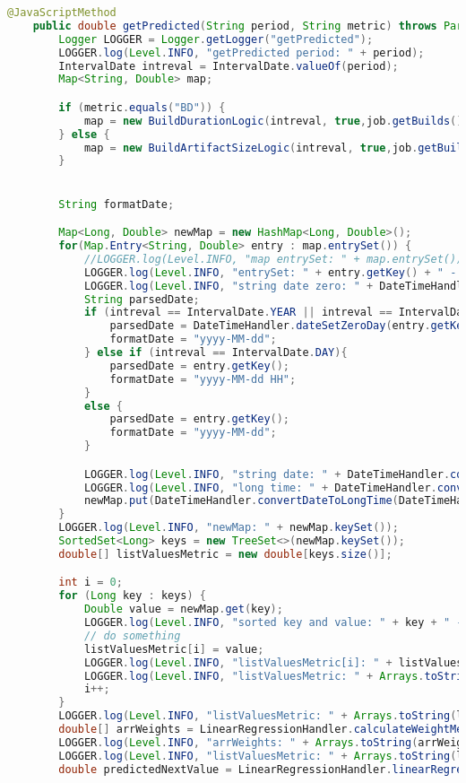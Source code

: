 \begin{lstlisting}[language=Java]
    @JavaScriptMethod
    public double getPredicted(String period, String metric) throws ParseException {
        Logger LOGGER = Logger.getLogger("getPredicted");
        LOGGER.log(Level.INFO, "getPredicted period: " + period);
        IntervalDate intreval = IntervalDate.valueOf(period);
        Map<String, Double> map;

        if (metric.equals("BD")) {
            map = new BuildDurationLogic(intreval, true,job.getBuilds()).getBuildsDuration(Statistics.AVG);
        } else {
            map = new BuildArtifactSizeLogic(intreval, true,job.getBuilds()).getArtifactSize(Statistics.AVG);
        }


        String formatDate;

        Map<Long, Double> newMap = new HashMap<Long, Double>();
        for(Map.Entry<String, Double> entry : map.entrySet()) {
            //LOGGER.log(Level.INFO, "map entrySet: " + map.entrySet());
            LOGGER.log(Level.INFO, "entrySet: " + entry.getKey() + " - " + entry.getValue());
            LOGGER.log(Level.INFO, "string date zero: " + DateTimeHandler.dateSetZeroDay(entry.getKey()));
            String parsedDate;
            if (intreval == IntervalDate.YEAR || intreval == IntervalDate.QUARTER) {
                parsedDate = DateTimeHandler.dateSetZeroDay(entry.getKey());
                formatDate = "yyyy-MM-dd";
            } else if (intreval == IntervalDate.DAY){
                parsedDate = entry.getKey();
                formatDate = "yyyy-MM-dd HH";
            }
            else {
                parsedDate = entry.getKey();
                formatDate = "yyyy-MM-dd";
            }

            LOGGER.log(Level.INFO, "string date: " + DateTimeHandler.convertStringToDate(parsedDate, formatDate));
            LOGGER.log(Level.INFO, "long time: " + DateTimeHandler.convertDateToLongTime(DateTimeHandler.convertStringToDate(parsedDate, formatDate)));
            newMap.put(DateTimeHandler.convertDateToLongTime(DateTimeHandler.convertStringToDate(parsedDate, formatDate)), entry.getValue());
        }
        LOGGER.log(Level.INFO, "newMap: " + newMap.keySet());
        SortedSet<Long> keys = new TreeSet<>(newMap.keySet());
        double[] listValuesMetric = new double[keys.size()];

        int i = 0;
        for (Long key : keys) {
            Double value = newMap.get(key);
            LOGGER.log(Level.INFO, "sorted key and value: " + key + " - " + value);
            // do something
            listValuesMetric[i] = value;
            LOGGER.log(Level.INFO, "listValuesMetric[i]: " + listValuesMetric[i]);
            LOGGER.log(Level.INFO, "listValuesMetric: " + Arrays.toString(listValuesMetric));
            i++;
        }
        LOGGER.log(Level.INFO, "listValuesMetric: " + Arrays.toString(listValuesMetric));
        double[] arrWeights = LinearRegressionHandler.calculateWeightMetric(listValuesMetric);
        LOGGER.log(Level.INFO, "arrWeights: " + Arrays.toString(arrWeights));
        LOGGER.log(Level.INFO, "listValuesMetric: " + Arrays.toString(listValuesMetric));
        double predictedNextValue = LinearRegressionHandler.linearRegression(listValuesMetric, arrWeights);


\end{lstlisting}
